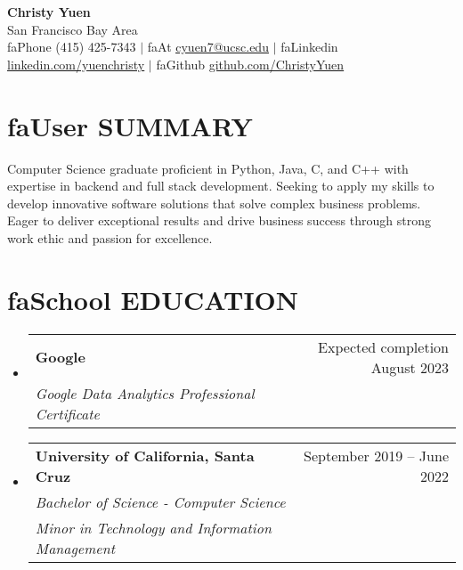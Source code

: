 \documentclass[a4paper,11pt]{article}
\makeatletter
\newcommand{\seticon}[1]{\textcolor{Cerulean}{\csname #1\endcsname}}
\newcommand{\resumeSubheading}[4]{
  \vspace{-2pt}\item
    \begin{tabular*}{0.97\textwidth}[t]{l@{\extracolsep{\fill}}r}
      \textbf{#1} & #2 \\
      \textit{\small#3} & \textnormal{\small #4} \\
    \end{tabular*}\vspace{-8pt}
}
\newcommand{\resumeSub}[6]{ %
  \vspace{-2pt}\item
    \begin{tabular*}{0.97\textwidth}[t]{l@{\extracolsep{\fill}}r}
      \textbf{#1} & #2 \\
      \textit{\small#3} & \textnormal{\small #4} \\
      \textit{\small#5} & \textnormal{\small #6} \\
    \end{tabular*} \vspace{-8pt}
}
\newcommand{\resumeSubHeadingListStart}{\begin{itemize}[leftmargin=0.15in, label={}]}
\newcommand{\resumeSubHeadingListEnd}{\end{itemize}}
\makeatother
\begin{document}
\iffalse
\begin{wrapfigure}{R}{0.15\textwidth}
\vspace{-25pt}
\texttt{[image: dp\_cropped]}
\end{wrapfigure}
\fi

\begin{center}
    \textbf{\Huge Christy Yuen} \\
    \normalfont San Francisco Bay Area \vspace{1pt} \\
    \small \seticon{faPhone} (415) 425-7343 $|$ 
    \seticon{faAt} \href{mailto:x@x.com}{\ul{cyuen7@ucsc.edu}} $|$ 
    \seticon{faLinkedin} 
    		\href{https://www.linkedin.com/in/yuenchristy/}{\ul{linkedin.com/yuenchristy}} $|$ 
    \seticon{faGithub} 
    		\href{https://github.com/ChristyYuen}{\ul{github.com/ChristyYuen}}
\end{center}
\vspace{-12pt} %
\section{\seticon{faUser} \textbf{SUMMARY}}
Computer Science graduate proficient in Python, Java, C, and C++ with expertise in backend and full stack development. Seeking to apply my skills to develop innovative software solutions that solve complex business problems. Eager to deliver exceptional results and drive business success through strong work ethic and passion for excellence.
\vspace{-5pt}
\section{\seticon{faSchool} \textbf{EDUCATION}}
  \resumeSubHeadingListStart
  	\resumeSubheading
       {Google}{Expected completion August 2023}
       {Google Data Analytics Professional Certificate}{}
    \resumeSub
      {University of California, Santa Cruz}{September 2019 -- June 2022}
      {Bachelor of Science - Computer Science}{}
      {Minor in Technology and Information Management}{}   
  \resumeSubHeadingListEnd
\end{document}
